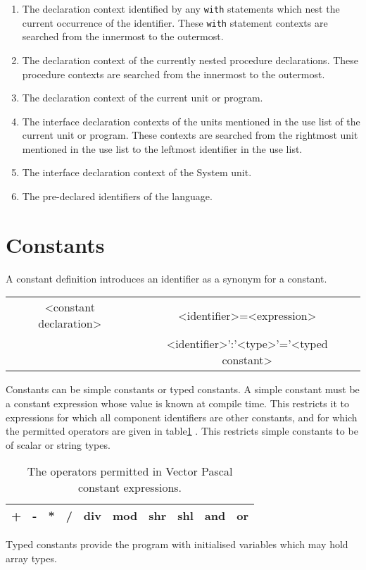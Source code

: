 \begin{enumerate}
\item The declaration context identified by any \texttt{with} statements which nest
the current occurrence of the identifier. These \texttt{with} statement contexts
are searched from the innermost to the outermost.
\item The declaration context of the currently nested procedure
declarations. These procedure contexts are searched from the innermost to the
outermost.
\item The declaration context of the current unit or program.
\item The interface declaration contexts of the units mentioned in the use list of
the current unit or program. These contexts are searched from the rightmost
unit mentioned in the use list to the leftmost identifier in the use list.
\item The interface declaration context of the System unit.
\item The pre-declared identifiers of the language.
\end{enumerate}



\section{Constants}

A constant definition introduces an identifier as a synonym for a constant. 

\vspace{0.3cm}
{\centering \begin{tabular}{|c|c|}
\hline 
<constant declaration>&
<identifier>=<expression>\\
&
<identifier>':'<type>'='<typed constant>\\
\hline 
\end{tabular}\par}
\vspace{0.3cm}

Constants can be simple constants or typed constants. A simple constant must
be a constant expression whose value is known at compile time. This restricts
it to expressions for which all component identifiers are other constants, and
for which the permitted operators are given in table\ref{MMConst}
. This restricts simple constants to be of scalar or string types.


\begin{table}

\caption{The operators permitted in Vector Pascal constant expressions.\label{MMConst}}
{\centering \begin{tabular}{|c|c|c|c|c|c|c|c|c|c|}
\hline 
+&
-&
{*}&
/&
div&
mod&
shr&
shl&
and&
or\\
\hline 
\end{tabular}\par}\end{table}
Typed constants provide the program with initialised variables which may hold
array types.

